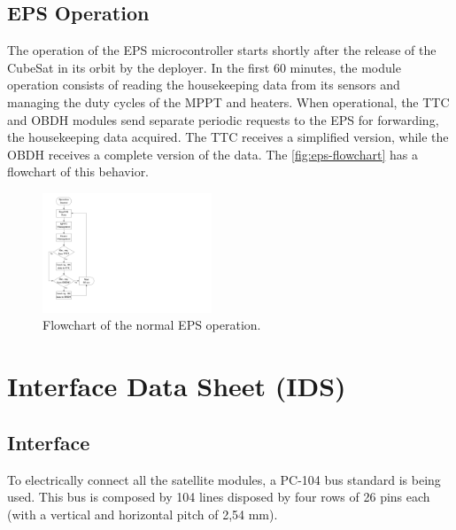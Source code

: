 \subsection{EPS Operation}

The operation of the EPS microcontroller starts shortly after the release of the CubeSat in its orbit by the deployer.
In the first 60 minutes, the module operation consists of reading the housekeeping data from its sensors and managing the duty cycles of the MPPT and heaters.
When operational, the TTC and OBDH modules send separate periodic requests to the EPS for forwarding, the housekeeping data acquired.
The TTC receives a simplified version, while the OBDH receives a complete version of the data.
The \autoref{fig:eps-flowchart} has a flowchart of this behavior.

\begin{figure}[!htb]
    \begin{center}
        \includegraphics[width=0.45\textwidth]{figures/eps_flowchart.pdf}
        \caption{Flowchart of the normal EPS operation.}
        \label{fig:eps-flowchart}
    \end{center}
\end{figure}



\section{Interface Data Sheet (IDS)}

\subsection{Interface}

To electrically connect all the satellite modules, a PC-104 bus standard is being used. This bus is composed by 104 lines disposed by four rows of 26 pins each (with a vertical and horizontal pitch of 2,54 mm).

